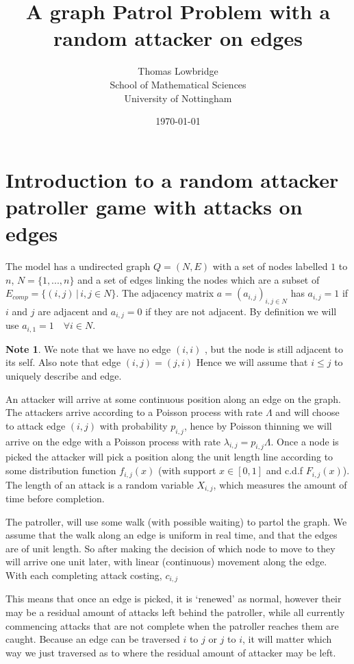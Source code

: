 \documentclass[a4paper,10pt]{article}
\title{A graph Patrol Problem with a random attacker on edges}
\date{\today}
\author{Thomas Lowbridge \\ School of Mathematical Sciences \\ University of Nottingham}
\theoremstyle{definition}
\theoremstyle{definition}
\theoremstyle{remark}
\theoremstyle{definition}
\newtheorem*{note}{Note}
\begin{document}
\pagestyle{empty}
{
  \renewcommand{\thispagestyle}[1]{}
  \maketitle
  \tableofcontents  
}
\clearpage
\pagestyle{plain}


\setlength{\parindent}{0pt}
\setlength{\parskip}{1em}

\newpage
{}
\section{Introduction to a random attacker patroller game with attacks on edges}
The model has a undirected graph $Q=(N,E)$ with a set of nodes labelled $1$ to $n$, $N=\{1,...,n \}$ and a set of edges linking the nodes which are a subset of $E_{comp}=\{(i,j) \, | \, i,j \in N \}$. The adjacency matrix $a=(a_{i,j})_{i,j \in N}$ has $a_{i,j}=1$ if $i$ and $j$ are adjacent and $a_{i,j}=0$ if they are not adjacent. By definition we will use $a_{i,1}=1 \quad \forall i \in N$.

\begin{note}
We note that we have no edge $(i,i)$ , but the node is still adjacent to its self. Also note that edge $(i,j)=(j,i)$ Hence we will assume that $i \leq j$ to uniquely describe and edge.
\end{note}

An attacker will arrive at some continuous position along an edge on the graph. The attackers arrive according to a Poisson process with rate $\Lambda$ and will choose to attack edge $(i,j)$ with probability $p_{i,j}$, hence by Poisson thinning we will arrive on the edge with a Poisson process with rate $\lambda_{i,j}=p_{i,j} \Lambda$. Once a node is picked the attacker will pick a position along the unit length line according to some distribution function $f_{i,j}(x)$ (with support $x \in [0,1]$ and c.d.f $F_{i,j}(x)$). The length of an attack is a random variable $X_{i,j}$, which measures the amount of time before completion.

The patroller, will use some walk (with possible waiting) to partol the graph. We assume that the walk along an edge is uniform in real time, and that the edges are of unit length. So after making the decision of which node to move to they will arrive one unit later, with linear (continuous) movement along the edge. With each completing attack costing, $c_{i,j}$

This means that once an edge is picked, it is `renewed' as normal, however their may be a residual amount of attacks left behind the patroller, while all currently commencing attacks that are not complete when the patroller reaches them are caught. Because an edge can be traversed $i$ to $j$ or $j$ to $i$, it will matter which way we just traversed as to where the residual amount of attacker may be left.
\end{document}
